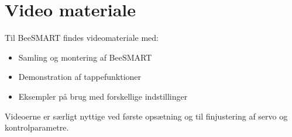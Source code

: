 \documentclass[11pt,a4paper]{article}
\begin{document}
\section{Video materiale}

Til BeeSMART findes videomateriale med:

\begin{itemize}[leftmargin=*]
    \item Samling og montering af BeeSMART
    \item Demonstration af tappefunktioner
    \item Eksempler på brug med forskellige indstillinger
\end{itemize}

\vspace{2em}
Videoerne er særligt nyttige ved første opsætning og til finjustering af servo og kontrolparametre.
\vspace{2em}
\end{document}
